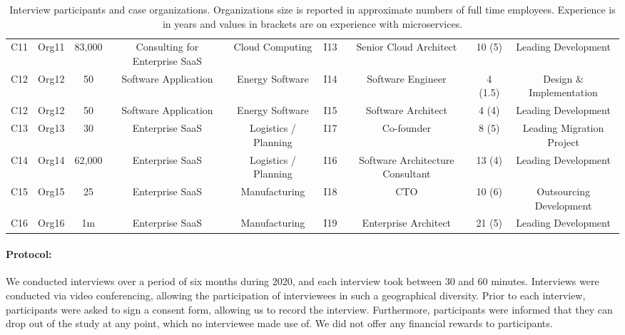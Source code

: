 \documentclass[sigconf,dvipsnames]{acmart}
\begin{document}
\begin{table*}[h!]
\begin{tabular}{ c c c c c c c c c}
C11 & Org11 & 83,000 & Consulting for Enterprise SaaS & Cloud Computing & I13 & Senior Cloud Architect & 10 (5) & Leading Development \\[0.1em] 
C12 & Org12 & 50 & Software Application & Energy Software & I14 & Software Engineer & 4 (1.5) & Design \& Implementation \\[0.1em]
C12 & Org12 & 50 & Software Application & Energy Software & I15 & Software Architect & 4 (4) & Leading Development \\[0.1em]
C13 & Org13 & 30 & Enterprise SaaS & Logistics / Planning & I17 & Co-founder & 8 (5) & Leading Migration Project \\[0.1em] 
C14 & Org14 & 62,000 & Enterprise SaaS & Logistics / Planning & I16 & Software Architecture Consultant & 13 (4) & Leading Development \\[0.1em]
C15 & Org15 & 25 & Enterprise SaaS & Manufacturing & I18 & CTO & 10 (6) & Outsourcing Development \\[0.1em] 
C16 & Org16 & 1m & Enterprise SaaS & Manufacturing & I19 & Enterprise Architect & 21 (5) & Leading Development \\[0.1em]
\end{tabular}
\caption{Interview participants and case organizations. Organizations size is reported in approximate numbers of full time employees. Experience is in years and values in brackets are on experience with microservices.}
\label{tab:interviewees}
\end{table*}

\vspace{-0.1em}
\paragraph*{Protocol:}
We conducted interviews over a period of six months during 2020, and each interview took between 30 and 60 minutes. Interviews were conducted via video conferencing, allowing the participation of interviewees in such a geographical diversity. Prior to each interview, participants were asked to sign a consent form, allowing us to record the interview. Furthermore, participants were informed that they can drop out of the study at any point, which no interviewee made use of. We did not offer any financial rewards to participants.

\vspace{-0.1em}
\end{document}
